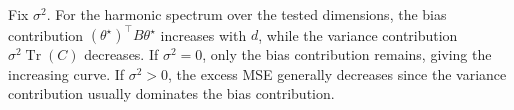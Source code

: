 \documentclass[11pt]{article}
\theoremstyle{plain}
\theoremstyle{definition}
\theoremstyle{remark}
\begin{document}
Fix $\sigma^2$. 
For the harmonic spectrum over the tested dimensions, the bias contribution $(\theta^\star)^\top B\theta^\star$ increases with \(d\), while the variance contribution $\sigma^2\operatorname{Tr}(C)$ decreases.
If $\sigma^2 = 0$, only the bias contribution remains, giving the increasing curve.
If $\sigma^2 > 0$, the excess MSE generally decreases since the variance contribution usually dominates the bias contribution.
\end{document}
